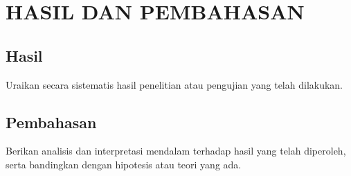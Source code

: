 \chapter{HASIL DAN PEMBAHASAN}

\section{Hasil}
Uraikan secara sistematis hasil penelitian atau pengujian yang telah dilakukan. 

\section{Pembahasan}
Berikan analisis dan interpretasi mendalam terhadap hasil yang telah diperoleh, serta bandingkan dengan hipotesis atau teori yang ada.
